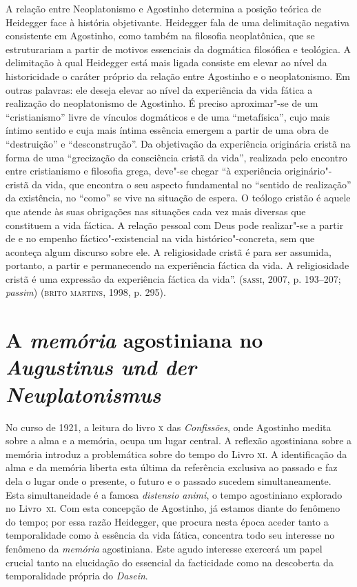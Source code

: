 A relação entre Neoplatonismo e Agostinho determina a posição
teórica de Heidegger face à história objetivante. Heidegger fala
de uma delimitação negativa consistente em Agostinho, como
também na filosofia neoplatônica, que se estruturariam a partir
de motivos essenciais da dogmática filosófica e teológica. A
delimitação à qual Heidegger está mais ligada consiste em elevar
ao nível da historicidade o caráter próprio da relação entre
Agostinho e o neoplatonismo. Em outras palavras: ele deseja
elevar ao nível da experiência da vida fática a realização do
neoplatonismo de Agostinho. É preciso aproximar"-se de um
“cristianismo” livre de vínculos dogmáticos e de uma
“metafísica”, cujo mais íntimo sentido e cuja mais íntima
essência emergem a partir de uma obra de “destruição” e
“desconstrução”. Da objetivação da experiência originária cristã
na forma de uma “grecização da consciência cristã da vida”,
realizada pelo encontro entre cristianismo e filosofia grega,
deve"-se chegar “à experiência originário"-cristã da vida, que
encontra o seu aspecto fundamental no ``sentido de realização'' da
existência, no ``como'' se vive na situação de espera. O teólogo
cristão é aquele que atende às suas obrigações nas situações
cada vez mais diversas que constituem a vida fáctica. A relação
pessoal com Deus pode realizar"-se a partir de e no empenho
fáctico"-existencial na vida histórico"-concreta, sem que aconteça
algum discurso sobre ele. A religiosidade cristã é para ser
assumida, portanto, a partir e permanecendo na experiência
fáctica da vida. A religiosidade cristã é uma expressão da
experiência fáctica da vida”.  (\textsc{sassi}, 2007, p. 193--207;
\emph{passim}) (\textsc{brito martins}, 1998, p. 295). 

\section{A \emph{memória} agostiniana no \emph{Augustinus und der Neuplatonismus}}

No curso de 1921, a leitura do livro \textsc{x} das \emph{Confissões},
onde Agostinho medita sobre a alma e a memória, ocupa um lugar
central. A reflexão agostiniana sobre a memória introduz a
problemática sobre do tempo do Livro \textsc{xi}. A identificação da alma
e da memória liberta esta última da referência exclusiva ao
passado e faz dela o lugar onde o presente, o futuro e o passado
sucedem simultaneamente. Esta simultaneidade é a famosa
\emph{distensio animi}, o tempo agostiniano explorado no Livro~\textsc{xi}. 
Com esta concepção de Agostinho, já estamos diante do
fenômeno do tempo; por essa razão Heidegger, que procura nesta
época aceder tanto a temporalidade como à essência da vida
fática, concentra todo seu interesse no fenômeno da
\emph{memória} agostiniana. Este agudo interesse exercerá um
papel crucial tanto na elucidação do essencial da facticidade
como na descoberta da temporalidade própria do \emph{Dasein}. 

